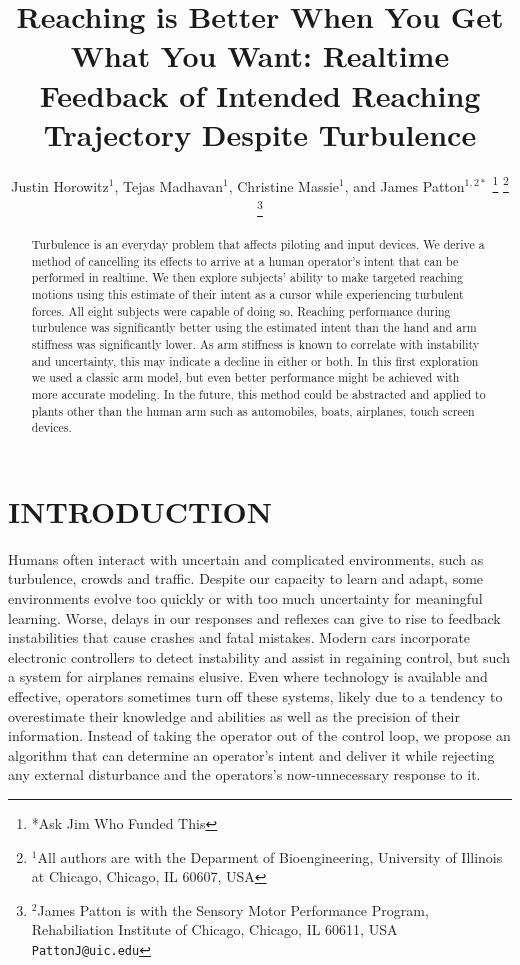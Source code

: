 \documentclass[letterpaper, 10 pt, conference]{ieeeconf}  %
\title{\LARGE \bf
Reaching is Better When You Get What You Want: Realtime Feedback of Intended Reaching Trajectory Despite Turbulence
}
\author{Justin Horowitz$^{1}$, Tejas Madhavan$^{1}$, Christine Massie$^{1}$, and James Patton$^{1,2*}$%
\thanks{*Ask Jim Who Funded This}%
\thanks{$^{1}$All authors are with the Deparment of Bioengineering, University of Illinois at Chicago, 
		Chicago, IL 60607, USA 
		}
\thanks{$^{2}$James Patton is with the Sensory Motor Performance Program, Rehabiliation Institute of Chicago,
       Chicago, IL 60611, USA
       {\tt\small PattonJ@uic.edu}}%
}
\begin{document}
\maketitle
\thispagestyle{empty}
\pagestyle{empty}


\begin{abstract}
Turbulence is an everyday problem that affects piloting and input devices. We derive a method of cancelling its effects to arrive at a human operator's intent that can be performed in realtime. We then explore subjects' ability to make targeted reaching motions using this estimate of their intent as a cursor while experiencing turbulent forces. All eight subjects were capable of doing so. Reaching performance during turbulence was significantly better using the estimated intent than the hand and arm stiffness was significantly lower. As arm stiffness is known to correlate with instability and uncertainty, this may indicate a decline in either or both. In this first exploration we used a classic arm model, but even better performance might be achieved with more accurate modeling. In the future, this method could be abstracted and applied to plants other than the human arm such as automobiles, boats, airplanes, touch screen devices.
\end{abstract}


\section{INTRODUCTION}

Humans often interact with uncertain and complicated environments, such as turbulence, crowds and traffic. Despite our capacity to learn and adapt, some environments evolve too quickly or with too much uncertainty for meaningful learning. Worse, delays in our responses and reflexes can give to rise to feedback instabilities that cause crashes and fatal mistakes\cite{mcruer1995pilot}. Modern cars incorporate electronic controllers to detect instability and assist in regaining control\cite{lie2006effectiveness}, but such a system for airplanes remains elusive\cite{newman2012thirty}. Even where technology is available and effective, operators sometimes turn off these systems\cite{itoh2013evaluation}, likely due to a tendency to overestimate their knowledge and abilities as well as the precision of their information\cite{del2012decision}. Instead of taking the operator out of the control loop, we propose an algorithm that can determine an operator's intent and deliver it while rejecting any external disturbance and the operators's now-unnecessary response to it.
\end{document}
